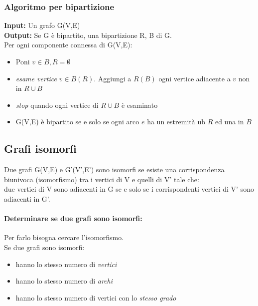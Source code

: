 \subsubsection{Algoritmo per bipartizione}
\textbf{Input:} Un grafo G(V,E) \\
\textbf{Output:} Se G è bipartito, una bipartizione R, B di G. \\
Per ogni componente connessa di G(V,E):
\begin{itemize}
\item Poni \(v \in B , R = \emptyset \)
\item \emph{esame vertice} $v \in B (R)$. Aggiungi a $R (B)$ ogni vertice adiacente a $v$ non in $R \cup B$
\item \emph{stop} quando ogni vertice di $R \cup B$ è esaminato
\item G(V,E) è bipartito se e solo se ogni arco $e$ ha un estremità ub $R$ ed una in $B$
\end{itemize}



\subsection{Grafi isomorfi}

Due grafi G(V,E) e G'(V',E') sono isomorfi se esiste una corrispondenza biunivoca (isomorfismo) tra i
vertici di V e quelli di V' tale che: \\
due vertici di V sono adiacenti in G se e solo se i corrispondenti vertici di V' sono adiacenti in G'. \\

\paragraph{Determinare se due grafi sono isomorfi:}
Per farlo bisogna cercare l'isomorfismo. \\
Se due grafi sono isomorfi:
\begin{itemize}
\item hanno lo stesso numero di \emph{vertici}
\item hanno lo stesso numero di \emph{archi}
\item hanno lo stesso numero di vertici con lo \emph{stesso grado}
\end{itemize}

